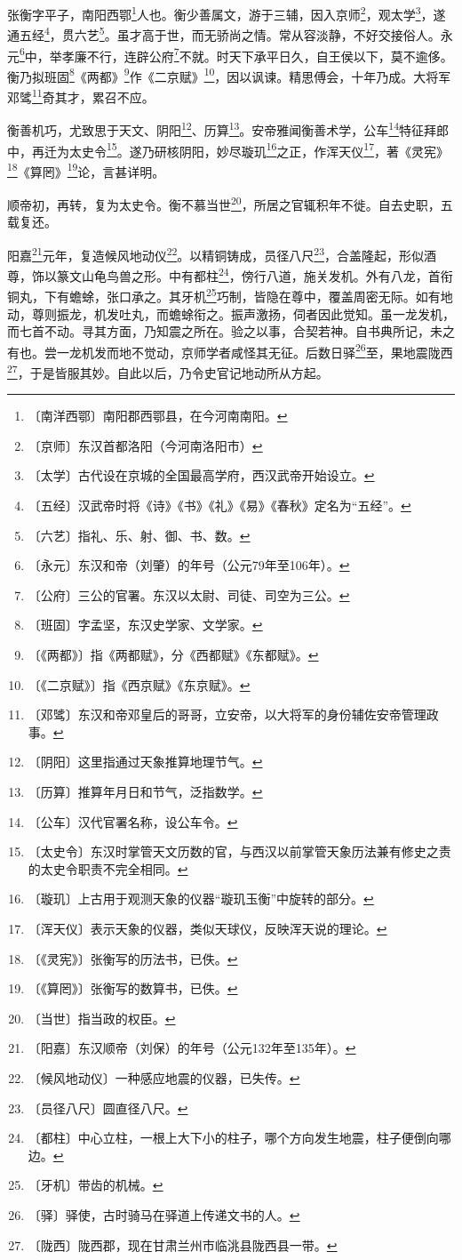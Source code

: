 \documentclass[12pt,UTF-8,openany,a4]{ctexbook}
\begin{document}
\begin{large}
    
    张衡字平子，南阳西鄂\footnote{〔南洋西鄂〕\yiwen 南阳郡西鄂县，在今河南南阳。}人也。衡少善属文，游于三辅，因入京师\footnote{〔京师〕\yiwen 东汉首都洛阳（今河南洛阳市）}，观太学\footnote{〔太学〕\yiwen 古代设在京城的全国最高学府，西汉武帝开始设立。}，遂通五经\footnote{〔五经〕\yiwen 汉武帝时将《诗》《书》《礼》《易》《春秋》定名为“五经”。}，贯六艺\footnote{〔六艺〕\yiwen 指礼、乐、射、御、书、数。}。虽才高于世，而无骄尚之情。常从容淡静，不好交接俗人。永元\footnote{〔永元〕\yiwen 东汉和帝（刘肇）的年号（公元79年至106年）。}中，举孝廉不行，连辟公府\footnote{〔公府〕\yiwen 三公的官署。东汉以太尉、司徒、司空为三公。}不就。时天下承平日久，自王侯以下，莫不逾侈。衡乃拟班固\footnote{〔班固〕\yiwen 字孟坚，东汉史学家、文学家。}《两都》\footnote{〔《两都》〕\yiwen 指《两都赋》，分《西都赋》《东都赋》。}作《二京赋》\footnote{〔《二京赋》〕\yiwen 指《西京赋》《东京赋》。}，因以讽谏。精思傅会，十年乃成。大将军邓骘\footnote{〔邓骘〕\yiwen 东汉和帝邓皇后的哥哥，立安帝，以大将军的身份辅佐安帝管理政事。}奇其才，累召不应。
    
    衡善机巧，尤致思于天文、阴阳\footnote{〔阴阳〕\yiwen 这里指通过天象推算地理节气。}、历算\footnote{〔历算〕\yiwen 推算年月日和节气，泛指数学。}。安帝雅闻衡善术学，公车\footnote{〔公车〕\yiwen 汉代官署名称，设公车令。}特征拜郎中，再迁为太史令\footnote{〔太史令〕\yiwen 东汉时掌管天文历数的官，与西汉以前掌管天象历法兼有修史之责的太史令职责不完全相同。}。遂乃研核阴阳，妙尽璇玑\footnote{〔璇玑〕\yiwen 上古用于观测天象的仪器“璇玑玉衡”中旋转的部分。}之正，作浑天仪\footnote{〔浑天仪〕\yiwen 表示天象的仪器，类似天球仪，反映浑天说的理论。}，著《灵宪》\footnote{〔《灵宪》〕\yiwen 张衡写的历法书，已佚。}《算罔》\footnote{〔《算罔》〕\yiwen 张衡写的数算书，已佚。}论，言甚详明。
    
    顺帝初，再转，复为太史令。衡不慕当世\footnote{〔当世〕\yiwen 指当政的权臣。}，所居之官辄积年不徙。自去史职，五载复还。
    
    阳嘉\footnote{〔阳嘉〕\yiwen 东汉顺帝（刘保）的年号（公元132年至135年）。}元年，复造候风地动仪\footnote{〔候风地动仪〕\yiwen 一种感应地震的仪器，已失传。}。以精铜铸成，员径八尺\footnote{〔员径八尺〕\yiwen 圆直径八尺。}，合盖隆起，形似酒尊，饰以篆文山龟鸟兽之形。中有都柱\footnote{〔都柱〕\yiwen 中心立柱，一根上大下小的柱子，哪个方向发生地震，柱子便倒向哪边。}，傍行八道，施关发机。外有八龙，首衔铜丸，下有蟾蜍，张口承之。其牙机\footnote{〔牙机〕\yiwen 带齿的机械。}巧制，皆隐在尊中，覆盖周密无际。如有地动，尊则振龙，机发吐丸，而蟾蜍衔之。振声激扬，伺者因此觉知。虽一龙发机，而七首不动。寻其方面，乃知震之所在。验之以事，合契若神。自书典所记，未之有也。尝一龙机发而地不觉动，京师学者咸怪其无征。后数日驿\footnote{〔驿〕\yiwen 驿使，古时骑马在驿道上传递文书的人。}至，果地震陇西\footnote{〔陇西〕\yiwen 陇西郡，现在甘肃兰州市临洮县陇西县一带。}，于是皆服其妙。自此以后，乃令史官记地动所从方起。
    

\end{large}
\end{document}
